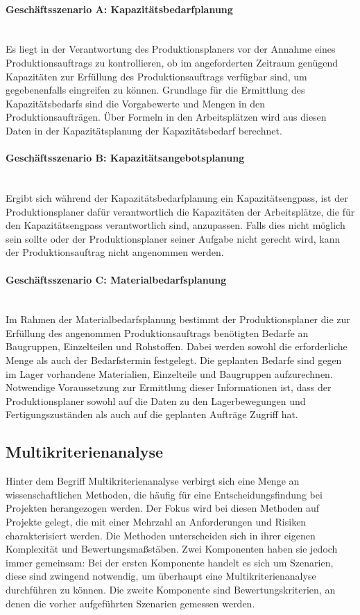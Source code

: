 \paragraph{Geschäftsszenario A: Kapazitätsbedarfplanung}\mbox{}\\
Es liegt in der Verantwortung des Produktionsplaners vor der Annahme eines Produktionsauftrags zu kontrollieren, ob im angeforderten Zeitraum genügend Kapazitäten zur Erfüllung des Produktionsauftrags verfügbar sind, um gegebenenfalls eingreifen zu können. Grundlage für die Ermittlung des Kapazitätsbedarfs sind die Vorgabewerte und Mengen in den Produktionsaufträgen. Über Formeln in den Arbeitsplätzen wird aus diesen Daten in der Kapazitätsplanung der Kapazitätsbedarf berechnet. 

\paragraph{Geschäftsszenario B: Kapazitätsangebotsplanung}\mbox{}\\
Ergibt sich während der Kapazitätsbedarfplanung ein Kapazitätsengpass, ist der Produktionsplaner dafür verantwortlich die Kapazitäten der Arbeitsplätze, die für den Kapazitätsengpass verantwortlich sind, anzupassen. Falls dies nicht möglich sein sollte oder der Produktionsplaner seiner Aufgabe nicht gerecht wird, kann der Produktionsauftrag nicht angenommen werden.

\paragraph{Geschäftsszenario C: Materialbedarfsplanung}\mbox{}\\
Im Rahmen der Materialbedarfsplanung bestimmt der Produktionsplaner die zur Erfüllung des angenommen Produktionsauftrags benötigten Bedarfe an Baugruppen, Einzelteilen und Rohstoffen. Dabei werden sowohl die erforderliche Menge als auch der Bedarfstermin festgelegt. Die geplanten Bedarfe sind gegen im Lager vorhandene Materialien, Einzelteile und Baugruppen aufzurechnen. Notwendige Voraussetzung zur Ermittlung dieser Informationen ist, dass der Produktionsplaner sowohl auf die Daten zu den Lagerbewegungen und Fertigungszuständen als auch auf die geplanten Aufträge Zugriff hat.

\subsection{Multikriterienanalyse}
Hinter dem Begriff Multikriterienanalyse verbirgt sich eine Menge an wissenschaftlichen Methoden, die häufig für eine Entscheidungsfindung bei Projekten herangezogen werden. Der Fokus wird bei diesen Methoden auf Projekte gelegt, die mit einer Mehrzahl an Anforderungen und Risiken charakterisiert werden. Die Methoden unterscheiden sich in ihrer eigenen Komplexität und Bewertungsmaßstäben. Zwei Komponenten haben sie jedoch immer gemeinsam: Bei der ersten Komponente handelt es sich um Szenarien, diese sind zwingend notwendig, um überhaupt eine Multikriterienanalyse durchführen zu können. Die zweite Komponente sind Bewertungskriterien, an denen die vorher aufgeführten Szenarien gemessen werden. 
\autocite{Velasquez.2013}

